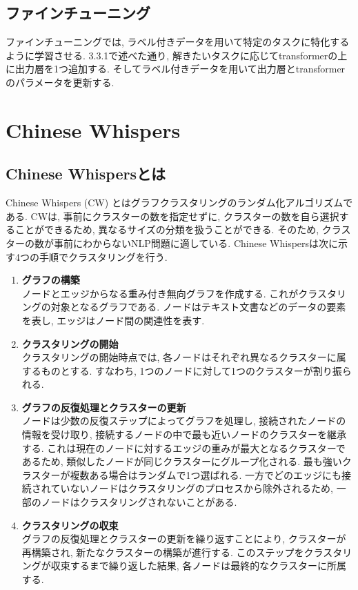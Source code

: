 \subsection{ファインチューニング}
ファインチューニングでは, ラベル付きデータを用いて特定のタスクに特化するように学習させる. 3.3.1で述べた通り, 解きたいタスクに応じてtransformerの上に出力層を1つ追加する. そしてラベル付きデータを用いて出力層とtransformerのパラメータを更新する. 


\section{Chinese Whispers}
\subsection{Chinese Whispersとは}
Chinese Whispers (CW) \cite{chinese-whispers}とはグラフクラスタリングのランダム化アルゴリズムである. CWは, 事前にクラスターの数を指定せずに, クラスターの数を自ら選択することができるため, 異なるサイズの分類を扱うことができる. そのため, クラスターの数が事前にわからないNLP問題に適している. 
Chinese Whispersは次に示す4つの手順でクラスタリングを行う. 

\begin{enumerate}[label=\textbf{\arabic*.}]
  \item \textbf{グラフの構築}\\
  ノードとエッジからなる重み付き無向グラフを作成する. これがクラスタリングの対象となるグラフである. ノードはテキスト文書などのデータの要素を表し, エッジはノード間の関連性を表す. \\
  
  \item \textbf{クラスタリングの開始}\\
  クラスタリングの開始時点では, 各ノードはそれぞれ異なるクラスターに属するものとする. すなわち, 1つのノードに対して1つのクラスターが割り振られる. \\
  
  \item \textbf{グラフの反復処理とクラスターの更新}\\
  ノードは少数の反復ステップによってグラフを処理し, 接続されたノードの情報を受け取り, 接続するノードの中で最も近いノードのクラスターを継承する. これは現在のノードに対するエッジの重みが最大となるクラスターであるため, 類似したノードが同じクラスターにグループ化される. 
  最も強いクラスターが複数ある場合はランダムで1つ選ばれる. 一方でどのエッジにも接続されていないノードはクラスタリングのプロセスから除外されるため, 一部のノードはクラスタリングされないことがある. \\
  
  \item \textbf{クラスタリングの収束}\\
  グラフの反復処理とクラスターの更新を繰り返すことにより, クラスターが再構築され, 新たなクラスターの構築が進行する. このステップをクラスタリングが収束するまで繰り返した結果, 各ノードは最終的なクラスターに所属する. 
\end{enumerate}
